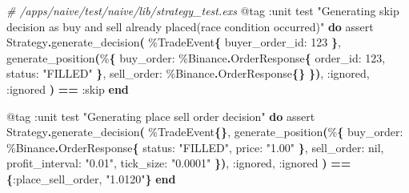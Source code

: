 \documentclass[
  oneside]{book}
\newenvironment{Shaded}{\begin{snugshade}}{\end{snugshade}}
\newcommand{\CommentTok}[1]{\textcolor[rgb]{0.56,0.35,0.01}{\textit{#1}}}
\newcommand{\ConstantTok}[1]{\textcolor[rgb]{0.56,0.35,0.01}{#1}}
\newcommand{\DecValTok}[1]{\textcolor[rgb]{0.00,0.00,0.81}{#1}}
\newcommand{\FunctionTok}[1]{\textcolor[rgb]{0.13,0.29,0.53}{\textbf{#1}}}
\newcommand{\KeywordTok}[1]{\textcolor[rgb]{0.13,0.29,0.53}{\textbf{#1}}}
\newcommand{\NormalTok}[1]{#1}
\newcommand{\OperatorTok}[1]{\textcolor[rgb]{0.81,0.36,0.00}{\textbf{#1}}}
\newcommand{\OtherTok}[1]{\textcolor[rgb]{0.56,0.35,0.01}{#1}}
\newcommand{\StringTok}[1]{\textcolor[rgb]{0.31,0.60,0.02}{#1}}
\newcommand{\VariableTok}[1]{\textcolor[rgb]{0.00,0.00,0.00}{#1}}
\begin{document}
\begin{Shaded}
\begin{Highlighting}[]
  \CommentTok{\# /apps/naive/test/naive/lib/strategy\_test.exs}
  \OtherTok{@tag} \VariableTok{:unit}
\NormalTok{  test }\StringTok{"Generating skip decision as buy and sell already placed(race condition occurred)"} \KeywordTok{do}
\NormalTok{    assert }\ConstantTok{Strategy}\OperatorTok{.}\NormalTok{generate\_decision}\FunctionTok{(}
\NormalTok{             \%}\ConstantTok{TradeEvent}\FunctionTok{\{}
               \VariableTok{buyer\_order\_id:} \DecValTok{123}
             \FunctionTok{\}}\NormalTok{,}
\NormalTok{             generate\_position}\FunctionTok{(}\NormalTok{\%}\FunctionTok{\{}
               \VariableTok{buy\_order:}\NormalTok{ \%}\ConstantTok{Binance}\OperatorTok{.}\ConstantTok{OrderResponse}\FunctionTok{\{}
                 \VariableTok{order\_id:} \DecValTok{123}\NormalTok{,}
                 \VariableTok{status:} \StringTok{"FILLED"}
               \FunctionTok{\}}\NormalTok{,}
               \VariableTok{sell\_order:}\NormalTok{ \%}\ConstantTok{Binance}\OperatorTok{.}\ConstantTok{OrderResponse}\FunctionTok{\{\}}
             \FunctionTok{\})}\NormalTok{,}
             \VariableTok{:ignored}\NormalTok{,}
             \VariableTok{:ignored}
           \FunctionTok{)} \OperatorTok{==} \VariableTok{:skip}
  \KeywordTok{end}

  \OtherTok{@tag} \VariableTok{:unit}
\NormalTok{  test }\StringTok{"Generating place sell order decision"} \KeywordTok{do}
\NormalTok{    assert }\ConstantTok{Strategy}\OperatorTok{.}\NormalTok{generate\_decision}\FunctionTok{(}
\NormalTok{             \%}\ConstantTok{TradeEvent}\FunctionTok{\{\}}\NormalTok{,}
\NormalTok{             generate\_position}\FunctionTok{(}\NormalTok{\%}\FunctionTok{\{}
               \VariableTok{buy\_order:}\NormalTok{ \%}\ConstantTok{Binance}\OperatorTok{.}\ConstantTok{OrderResponse}\FunctionTok{\{}
                 \VariableTok{status:} \StringTok{"FILLED"}\NormalTok{,}
                 \VariableTok{price:} \StringTok{"1.00"}
               \FunctionTok{\}}\NormalTok{,}
               \VariableTok{sell\_order:} \ConstantTok{nil}\NormalTok{,}
               \VariableTok{profit\_interval:} \StringTok{"0.01"}\NormalTok{,}
               \VariableTok{tick\_size:} \StringTok{"0.0001"}
             \FunctionTok{\})}\NormalTok{,}
             \VariableTok{:ignored}\NormalTok{,}
             \VariableTok{:ignored}
           \FunctionTok{)} \OperatorTok{==} \FunctionTok{\{}\VariableTok{:place\_sell\_order}\NormalTok{, }\StringTok{"1.0120"}\FunctionTok{\}}
  \KeywordTok{end}


\end{Highlighting}
\end{Shaded}
\end{document}

